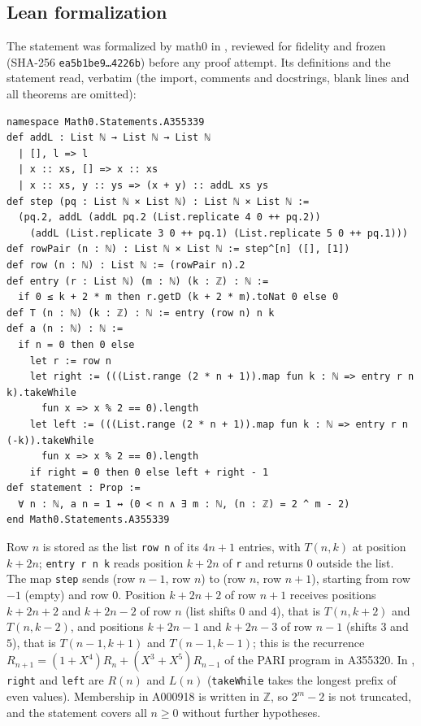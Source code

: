 \documentclass[11pt]{amsart}
\theoremstyle{plain}
\theoremstyle{definition}
\newcommand{\Z}{\mathbb{Z}}
\begin{document}
\subsection*{Lean formalization}
The statement was formalized by math0 in , reviewed for fidelity and frozen (SHA-256 \texttt{ea5b1be9\ldots 4226b}) before any proof attempt. Its definitions and the statement read, verbatim (the import, comments and docstrings, blank lines and all theorems are omitted):
\begin{lstlisting}
namespace Math0.Statements.A355339
def addL : List ℕ → List ℕ → List ℕ
  | [], l => l
  | x :: xs, [] => x :: xs
  | x :: xs, y :: ys => (x + y) :: addL xs ys
def step (pq : List ℕ × List ℕ) : List ℕ × List ℕ :=
  (pq.2, addL (addL pq.2 (List.replicate 4 0 ++ pq.2))
    (addL (List.replicate 3 0 ++ pq.1) (List.replicate 5 0 ++ pq.1)))
def rowPair (n : ℕ) : List ℕ × List ℕ := step^[n] ([], [1])
def row (n : ℕ) : List ℕ := (rowPair n).2
def entry (r : List ℕ) (m : ℕ) (k : ℤ) : ℕ :=
  if 0 ≤ k + 2 * m then r.getD (k + 2 * m).toNat 0 else 0
def T (n : ℕ) (k : ℤ) : ℕ := entry (row n) n k
def a (n : ℕ) : ℕ :=
  if n = 0 then 0 else
    let r := row n
    let right := (((List.range (2 * n + 1)).map fun k : ℕ => entry r n k).takeWhile
      fun x => x % 2 == 0).length
    let left := (((List.range (2 * n + 1)).map fun k : ℕ => entry r n (-k)).takeWhile
      fun x => x % 2 == 0).length
    if right = 0 then 0 else left + right - 1
def statement : Prop :=
  ∀ n : ℕ, a n = 1 ↔ (0 < n ∧ ∃ m : ℕ, (n : ℤ) = 2 ^ m - 2)
end Math0.Statements.A355339
\end{lstlisting}
Row $n$ is stored as the list \texttt{row n} of its $4n+1$ entries, with $T(n,k)$ at position $k+2n$; \texttt{entry r n k} reads position $k+2n$ of \texttt{r} and returns $0$ outside the list. The map \texttt{step} sends (row $n-1$, row $n$) to (row $n$, row $n+1$), starting from row $-1$ (empty) and row $0$. Position $k+2n+2$ of row $n+1$ receives positions $k+2n+2$ and $k+2n-2$ of row $n$ (list shifts $0$ and $4$), that is $T(n,k+2)$ and $T(n,k-2)$, and positions $k+2n-1$ and $k+2n-3$ of row $n-1$ (shifts $3$ and $5$), that is $T(n-1,k+1)$ and $T(n-1,k-1)$; this is the recurrence $R_{n+1}=(1+X^4)R_n+(X^3+X^5)R_{n-1}$ of the PARI program in A355320. In , \texttt{right} and \texttt{left} are $R(n)$ and $L(n)$ (\texttt{takeWhile} takes the longest prefix of even values). Membership in A000918 is written in $\Z$, so $2^m-2$ is not truncated, and the statement covers all $n\ge0$ without further hypotheses.
\end{document}

